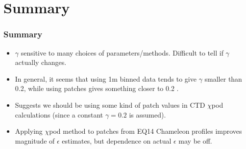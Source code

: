 \documentclass{beamer}
\begin{document}
\section{Summary}

\begin{frame}
 \frametitle{ Summary}

\begin{itemize}
\item $\gamma$ sensitive to many choices of parameters/methods. Difficult to tell if $\gamma$ actually changes.
\item In general, it seems that using 1m binned data tends to give $\gamma$ smaller than 0.2, while using patches gives something closer to 0.2 . 
\item Suggests we should be using some kind of patch values in CTD $\chi$pod calculations (since a constant $\gamma=0.2$ is assumed).
\item Applying $\chi$pod method to patches from EQ14 Chameleon profiles improves magnitude of $\epsilon$ estimates, but dependence on actual $\epsilon$ may be off.
\end{itemize}

\end{frame}



\end{document}
